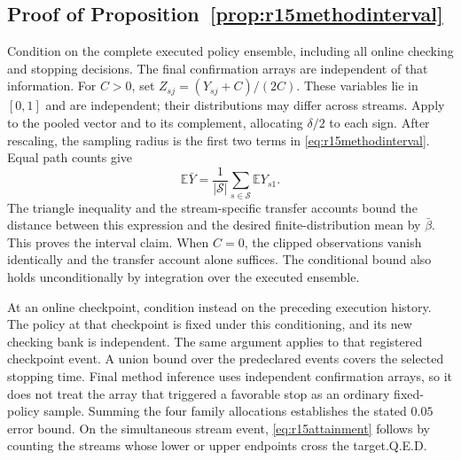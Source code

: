 \subsection{Proof of Proposition~\ref{prop:r15methodinterval}}
\label{sec:r15methodintervalproof}

Condition on the complete executed policy ensemble, including all online
checking and stopping decisions. The final confirmation arrays are independent
of that information. For $C>0$, set
$Z_{sj}=(Y_{sj}+C)/(2C)$. These variables lie in $[0,1]$ and are independent;
their distributions may differ across streams. Apply
\citet[Theorem~11]{maurer2009} to the pooled vector and to its complement,
allocating $\delta/2$ to each sign. After rescaling, the sampling radius is
the first two terms in \eqref{eq:r15methodinterval}. Equal path counts give
\[
 \mathbb E\bar Y=
 \frac{1}{|\mathcal S|}\sum_{s\in\mathcal S}\mathbb E Y_{s1}.
\]
The triangle inequality and the stream-specific transfer accounts bound the
distance between this expression and the desired finite-distribution mean
by $\bar\beta$. This proves the interval claim. When $C=0$, the clipped
observations vanish identically and the transfer account alone suffices.
The conditional bound also holds unconditionally by integration over the
executed ensemble.

At an online checkpoint, condition instead on the preceding execution history.
The policy at that checkpoint is fixed under this conditioning, and its new
checking bank is independent. The same argument applies to that registered
checkpoint event. A union bound over the predeclared events covers the selected
stopping time. Final method inference uses independent confirmation arrays,
so it does not treat the array that triggered a favorable stop as an ordinary
fixed-policy sample. Summing the four family allocations establishes the
stated $0.05$ error bound. On the simultaneous stream event,
\eqref{eq:r15attainment} follows by counting the streams whose lower or upper
endpoints cross the target.\hfill Q.E.D.
